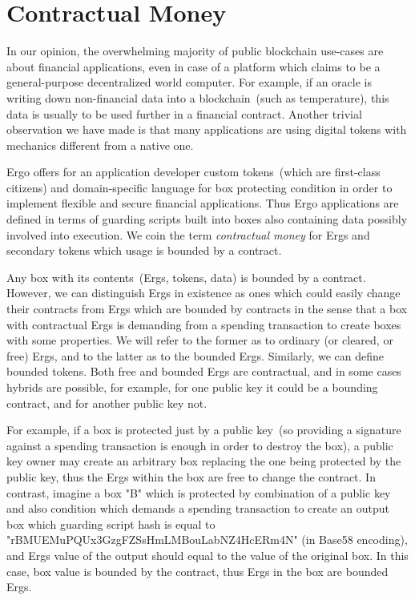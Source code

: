 

\section{Contractual Money}
    \label{sec:contractual}

 In our opinion, the overwhelming majority of public blockchain use-cases are about financial applications,
 even in case of a platform which claims to be a general-purpose decentralized world computer.
 For example, if an oracle is writing down
 non-financial data into a blockchain~(such as temperature), this data is usually to be used further in a financial
 contract. Another trivial observation we have made is that many applications are using digital tokens with mechanics
 different from a native one.

 Ergo offers for an application developer custom tokens~(which are first-class citizens) and domain-specific language
 for box protecting
 condition in order to implement flexible and secure financial applications.
 Thus Ergo applications are defined in terms of guarding scripts built into boxes also containing
 data possibly involved into execution. We coin the term {\em contractual money} for Ergs and secondary tokens which
 usage is bounded by a contract.

 Any box with its contents~(Ergs, tokens, data) is bounded by a contract.
 However, we can distinguish Ergs in existence as ones which could easily
 change their contracts from Ergs which are bounded by contracts in the sense that a box with contractual Ergs is
 demanding from a spending transaction to create boxes with some properties. We will refer to the former as to ordinary
 (or cleared, or free) Ergs, and to the latter as to the bounded Ergs. Similarly, we can define bounded tokens. Both
 free and bounded Ergs are contractual, and in some cases hybrids are possible, for example, for one public key it could
 be a bounding contract, and for another public key not.

 For example, if a box is protected just by a public key~(so providing a signature against a spending transaction is
 enough in order to destroy the box), a public key owner may create an arbitrary box replacing the one being protected
 by the public key, thus the Ergs within the box are free to change the contract. In contrast, imagine a box "B" which
 is protected by combination of a public key and also condition which demands a spending transaction to create an output
 box which guarding script hash is equal to "rBMUEMuPQUx3GzgFZSsHmLMBouLabNZ4HcERm4N" (in Base58 encoding), and Ergs
 value of the output should equal to the value of the original box. In this case, box value is bounded by the contract,
 thus Ergs in the box are bounded Ergs.

